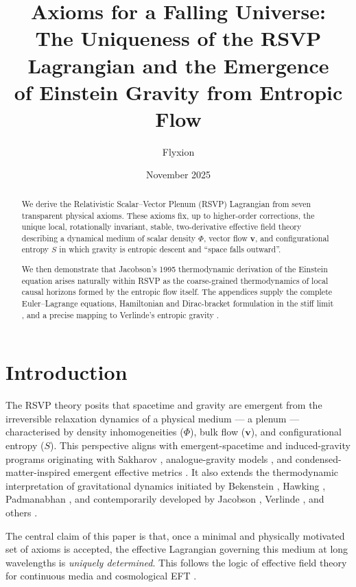 \documentclass[11pt,a4paper]{article}
\title{\Large\bfseries
Axioms for a Falling Universe:\\
The Uniqueness of the RSVP Lagrangian and the Emergence\\
of Einstein Gravity from Entropic Flow
}
\author{Flyxion}
\date{November 2025}
\begin{document}
\maketitle

\begin{abstract}
We derive the Relativistic Scalar–Vector Plenum (RSVP) Lagrangian from seven transparent physical axioms. These axioms fix, up to higher-order corrections, the unique local, rotationally invariant, stable, two-derivative effective field theory describing a dynamical medium of scalar density $\Phi$, vector flow $\mathbf{v}$, and configurational entropy $S$ in which gravity is entropic descent and “space falls outward”.

We then demonstrate that Jacobson’s 1995 thermodynamic derivation of the Einstein equation \cite{jacobson1995} arises naturally within RSVP as the coarse-grained thermodynamics of local causal horizons formed by the entropic flow itself. The appendices supply the complete Euler–Lagrange equations, Hamiltonian and Dirac-bracket formulation in the stiff limit \cite{dirac1964,henneaux1992}, and a precise mapping to Verlinde’s entropic gravity \cite{verlinde2011}.
\end{abstract}

\section{Introduction}

The RSVP theory posits that spacetime and gravity are emergent from the irreversible relaxation dynamics of a physical medium — a plenum — characterised by density inhomogeneities ($\Phi$), bulk flow ($\mathbf{v}$), and configurational entropy ($S$). This perspective aligns with emergent-spacetime and induced-gravity programs originating with Sakharov \cite{sakharov1967}, analogue-gravity models \cite{barcelo2005,unruh1981,visser1998}, and condensed-matter-inspired emergent effective metrics \cite{volovik2003}. It also extends the thermodynamic interpretation of gravitational dynamics initiated by Bekenstein \cite{bekenstein1973}, Hawking \cite{hawking1975}, Padmanabhan \cite{padmanabhan2005,padmanabhan2010}, and contemporarily developed by Jacobson \cite{jacobson1995}, Verlinde \cite{verlinde2011}, and others \cite{susskind2005}.

The central claim of this paper is that, once a minimal and physically motivated set of axioms is accepted, the effective Lagrangian governing this medium at long wavelengths is \emph{uniquely determined}. This follows the logic of effective field theory for continuous media \cite{nicolis2013,endlich2013,andersson2007} and cosmological EFT \cite{cheung2008}.
\end{document}

